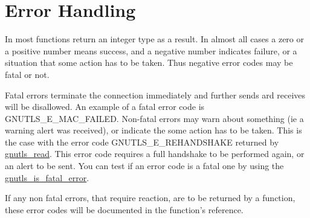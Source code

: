 \section{Error Handling}
\par
In \gnutls most functions return an integer type as a result.
In almost all cases a zero or a positive number means success, and
a negative number indicates failure, or a situation that some
action has to be taken. Thus negative error codes may be fatal
or not. 
\par 
Fatal errors terminate the connection immediately and
further sends ard receives will be disallowed. An example of
a fatal error code is GNUTLS\_E\_MAC\_FAILED. Non-fatal errors
may warn about something (ie a warning alert was received), or
indicate the some action has to be taken. This is the case with
the error code GNUTLS\_E\_REHANDSHAKE returned by 
\hyperref{gnutls\_read()}{gnutls\_read() (see Section }{)}{gnutls_read}.
This error code requires a full handshake to be performed again, or an alert to be sent.
You can test if an error code is a fatal one by using the
\hyperref{gnutls\_is\_fatal\_error()}{gnutls\_is\_fatal\_error() (see Section }{)}{gnutls_is_fatal_error}.
\par
If any non fatal errors, that require reaction, are to be returned by a
function, these error codes will be documented
in the function's reference.

